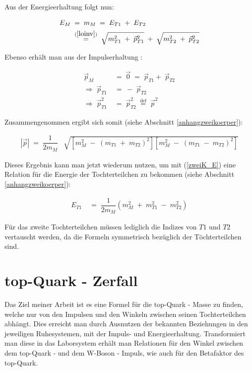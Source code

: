 \documentclass[
a4paper,                                %
twoside,                                %
BCOR1.4cm,                      %
ngerman,                                %
10pt,                           %
headings=normal,                %
headsepline,                    %
clearplainpage, %
final,                                  %
div=14,
parskip=full
]{scrbook}
\begin{document}
Aus der Energieerhaltung folgt nun:

\begin{align}
	E_{M}
\;&=\;
	m_{M}
\;=\;
	E_{T1}\;+\;E_{T2}
\nonumber
\\
\;&\stackrel{\mathrm{(\ref{loinv})}}=\;
	\sqrt{m_{T1}^{2}
	\;+\;\vec{p}_{T1}^{2}}
	\;+\;
	\sqrt{m_{T2}^{2}
	\;+\;\vec{p}_{T2}^{2}}
\label{zweiK_E}
\end{align}

Ebenso erh\"alt man aus der Impulserhaltung :

\begin{align}
	\vec{p}_{M}
\;&=\;
	\vec{0}
\;=\;
	\vec{p}_{T1}+\;\vec{p}_{T2}
\nonumber
\\
\Rightarrow\;
	\vec{p}_{T1}
\;&=\;
	-\;\vec{p}_{T2}
\nonumber
\\
\Rightarrow\;
	\vec{p}_{T1}^{2}\;&=\;
	\vec{p}_{T2}^{2}\;\stackrel{\mathrm{def}}=\;
	\vec{p}^{2}
\nonumber
\end{align}

Zusammengenommen ergibt sich somit (siehe Abschnitt \ref{anhangzweikoerper}):

\begin{align}
	|\vec{p}|
\;=\;
	\dfrac{1}{2 m_{M}}
	&\sqrt{
		\left[
		m_{M}^{2}\;-\;
			\left(
				m_{T1}\;+\;m_{T2}
			\right)^{2}
		\right]
		\left[
		m_{M}^{2}\;-\;
			\left(
				m_{T1}\;-\;m_{T2}
			\right)^{2}
		\right]
	}	
\label{zweiK_p}
\end{align}

Dieses Ergebnis kann man jetzt wiederum nutzen, um mit (\ref{zweiK_E}) eine Relation f\"ur die Energie der Tochterteilchen zu bekommen  (siehe Abschnitt \ref{anhangzweikoerper}):

\begin{align}
	E_{T1}
\;&=\;
	\dfrac{1}{2 m_{M}}
	\left(
		m_{M}^{2}\;+\;m_{T1}^{2}\;-\;m_{T2}^{2}
	\right)
\end{align}

F\"ur das zweite Tochterteilchen m\"ussen lediglich die Indizes von $ T1 $ und $ T2 $ vertauscht werden, da die Formeln symmetrisch bez\"uglich der T\"ochterteilchen sind. 

\newpage

\section{top-Quark - Zerfall}

Das Ziel meiner Arbeit ist es eine Formel f\"ur die top-Quark - Masse zu finden, welche nur von den Impulsen und den Winkeln zwischen seinen Tochterteilchen abh\"angt. Dies erreicht man durch Ausnutzen der bekannten Beziehungen in den jeweiligen Ruhesystemen, mit der Impuls- und Energieerhaltung. Transformiert man diese in das Laborsystem erh\"alt man Relationen f\"ur den Winkel zwischen dem top-Quark - und dem W-Boson - Impuls, wie auch f\"ur den Betafaktor des top-Quark. 
\end{document}
